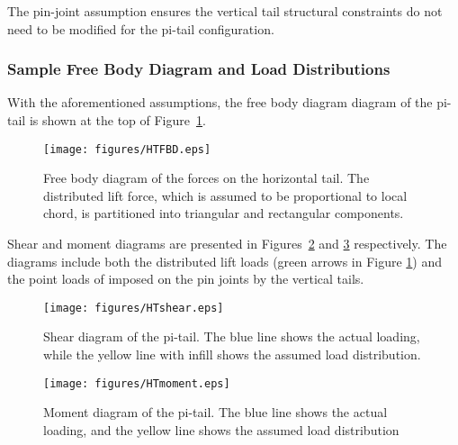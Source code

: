 The pin-joint assumption ensures the vertical tail structural constraints do not 
need to be modified for the pi-tail configuration. 

\subsubsection{Sample Free Body Diagram and Load Distributions}
\label{s:loadDistributions}

With the aforementioned assumptions, the free body diagram diagram of the 
pi-tail is shown at the top of Figure~\ref{fig:HTFBD}. 

\begin{figure}[!ht]
\centering
\texttt{[image: figures/HTFBD.eps]}
\caption{Free body diagram of the forces on the horizontal tail. The distributed 
lift force, which is assumed to be proportional to local chord, is partitioned 
into triangular and rectangular components.}
\label{fig:HTFBD}
\end{figure}

Shear and moment diagrams are presented in Figures~\ref{fig:HTshear} and 
\ref{fig:HTmoment} respectively. The diagrams include both the distributed lift 
loads (green arrows in Figure \ref{fig:HTFBD}) and the point loads of imposed on 
the pin joints by the vertical tails.

\begin{figure}[!ht]
    \centering
    \texttt{[image: figures/HTshear.eps]}
    \caption{Shear diagram of the pi-tail. The blue line shows the actual 
loading, while the yellow line with infill shows the assumed load distribution.}
    \label{fig:HTshear}
\end{figure}

\begin{figure}[!ht]
    \centering
    \texttt{[image: figures/HTmoment.eps]}
    \caption{Moment diagram of the pi-tail. The blue line shows the actual 
loading, and the yellow line shows the assumed load distribution}
    \label{fig:HTmoment}
\end{figure}

